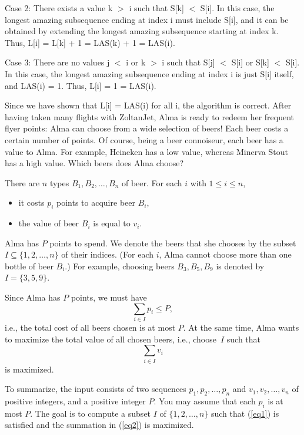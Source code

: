 \documentclass[12pt]{article}
\newcounter{ques}
\newenvironment{question}{\stepcounter{ques}{\noindent\bf Question \arabic{ques}:}}{\vspace{5mm}}
\newenvironment{solution}{{\noindent\bf Solution:}}{\vspace{5mm}}
\begin{document}
\begin{solution}
      Case 2: There exists a value k $>$ i such that S[k] $<$ S[i]. In this case, the longest amazing subsequence ending at index i must include S[i], and it can be obtained by extending the longest amazing subsequence starting at index k. Thus, L[i] = L[k] + 1 = LAS(k) + 1 = LAS(i).
      
      Case 3: There are no values j $<$ i or k $>$ i such that S[j] $<$ S[i] or S[k] $<$ S[i]. In this case, the longest amazing subsequence ending at index i is just S[i] itself, and LAS(i) = 1. Thus, L[i] = 1 = LAS(i).
      
      Since we have shown that L[i] = LAS(i) for all i, the algorithm is correct.
\end{solution}
\newpage
\begin{question} 
After having taken many flights with ZoltanJet, Alma is ready to redeem 
her frequent flyer points: Alma can choose from a wide selection of beers! 
Each beer costs a certain number of points. Of course, being a 
beer connoiseur, each beer has a value to Alma. For example, Heineken has 
a low value, whereas Minerva Stout has a high value. Which beers does 
Alma choose? 

There are $n$ types $B_1,B_2,\ldots,B_n$ of beer. For each $i$ with 
$1 \leq i \leq n$, 
\begin{itemize}
\item it costs $p_i$ points to acquire beer $B_i$, 
\item the value of beer $B_i$ is equal to $v_i$. 
\end{itemize} 
Alma has $P$ points to spend. We denote the beers that she chooses 
by the subset $I \subseteq \{1,2,\ldots,n\}$ of their indices. 
(For each $i$, Alma cannot choose more than one bottle of beer $B_i$.) 
For example, choosing beers $B_3,B_5,B_9$ is denoted by $I = \{3,5,9\}$. 

Since Alma has $P$ points, we must have 
\begin{equation}  \label{eq1} 
 \sum_{i \in I} p_i \leq P , 
\end{equation} 
i.e., the total cost of all beers chosen is at most $P$. 
At the same time, Alma wants to maximize the total value of all chosen 
beers, i.e., choose~$I$ such that 
\begin{equation}  \label{eq2} 
   \sum_{i \in I} v_i 
\end{equation} 
is maximized. 

To summarize, the input consists of two sequences 
$p_1,p_2,\ldots,p_n$ and $v_1,v_2,\ldots,v_n$ of positive integers, and 
a positive integer $P$. You may assume that each $p_i$ is at most $P$. 
The goal is to compute a subset $I$ of $\{1,2,\ldots,n\}$ such that 
(\ref{eq1}) is satisfied and the summation in (\ref{eq2}) is 
maximized.   


\end{question}
\end{document}
